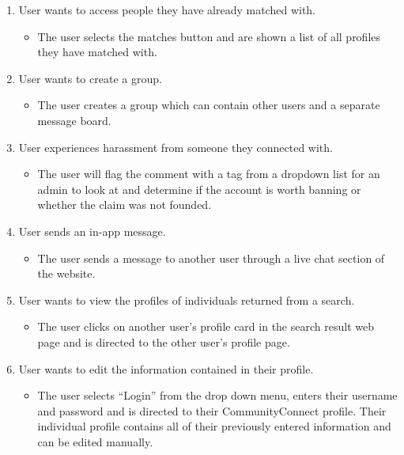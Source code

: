 \documentclass[12pt]{article}
\begin{document}
\begin{enumerate}
    \item User wants to access people they have already matched with.
      \begin{itemize}
        \item The user selects the matches button and are shown a list of all profiles they have matched with.
      \end{itemize}

    \item User wants to create a group.
      \begin{itemize}
        \item The user creates a group which can contain other users and a separate message board.
      \end{itemize}

    \item User experiences harassment from someone they connected with.
      \begin{itemize}
        \item The user will flag the comment with a tag from a dropdown list for an admin to look at and determine if the account is worth banning or whether the claim was not founded.
      \end{itemize}

    \item User sends an in-app message.
      \begin{itemize}
        \item The user sends a message to another user through a live chat section of the website.
      \end{itemize}

    \item User wants to view the profiles of individuals returned from a search.
      \begin{itemize}
        \item The user clicks on another user’s profile card in the search result web page and is directed to the other user’s profile page.
      \end{itemize}

    \item User wants to edit the information contained in their profile.
      \begin{itemize}
        \item The user selects “Login” from the drop down menu, enters their username and password and is directed to their CommunityConnect profile. Their individual profile contains all of their previously entered information and can be edited manually.
      \end{itemize}


\end{enumerate}
\end{document}
